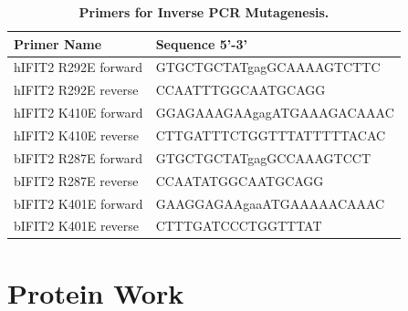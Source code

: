 \begin{table}
\centering
\begin{tabular}{ll}
\hline
\textbf{Primer Name}   & \textbf{Sequence 5'-3'}    \\ \hline
hIFIT2   R292E forward & GTGCTGCTATgagGCAAAAGTCTTC  \\ \hline
hIFIT2 R292E reverse   & CCAATTTGGCAATGCAGG         \\ \hline
hIFIT2   K410E forward & GGAGAAAGAAgagATGAAAGACAAAC \\ \hline
hIFIT2 K410E reverse   & CTTGATTTCTGGTTTATTTTTACAC  \\ \hline
bIFIT2   R287E forward & GTGCTGCTATgagGCCAAAGTCCT   \\ \hline
bIFIT2 R287E reverse   & CCAATATGGCAATGCAGG         \\ \hline
bIFIT2   K401E forward & GAAGGAGAAgaaATGAAAAACAAAC  \\ \hline
bIFIT2 K401E reverse   & CTTTGATCCCTGGTTTAT         \\ \hline
\end{tabular}
\caption[Primers for Inverse PCR Mutagenesis.]{\textbf{Primers for Inverse PCR Mutagenesis.}}
\label{Primers for Inverse PCR Mutagenesis table}
\end{table}




\section{Protein Work} \label{Protein Work}
